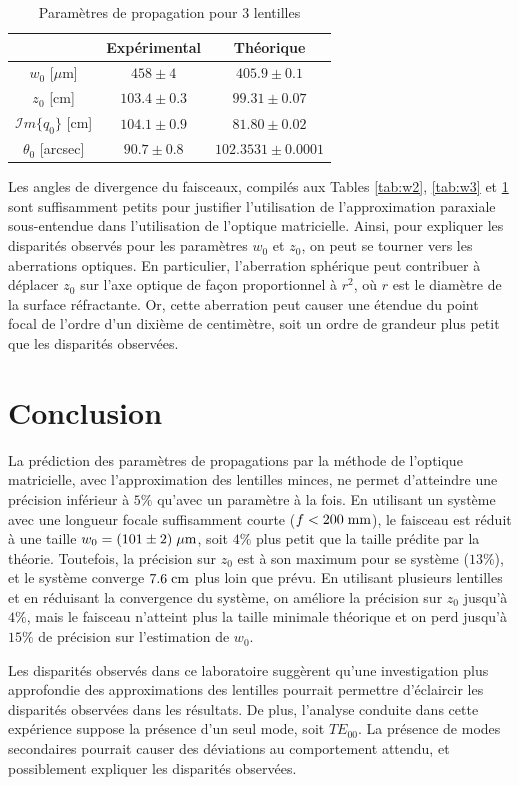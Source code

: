 \documentclass[10pt,letterpaper,twocolumn]{article}
\newcommand{\s}{\hspace{0.1cm}}
\begin{document}
\begin{table}[H]
	\centering
	\caption{Paramètres de propagation pour 3 lentilles}
	\label{tab:w4}
	\begin{tabular}{|c|c|c|}
		\hline
			&Expérimental & Théorique \\\hline
		$w_0$ [$\mu$m] & $458 \pm 4$& $405.9 \pm 0.1$ \\\hline
		  $z_0$ [cm] & $103.4 \pm 0.3$  & $99.31 \pm 0.07$ \\\hline
		  $\mathcal{I}m\{q_0\}$ [cm]  & $104.1 \pm 0.9$  & $81.80 \pm 0.02$ \\\hline
		  $\theta_0$ [arcsec]& $90.7 \pm 0.8$ & $102.3531 \pm  0.0001$ \\\hline
	\end{tabular}
\end{table}

Les angles de divergence du faisceaux, compilés aux Tables \ref{tab:w2}, \ref{tab:w3} et \ref{tab:w4} sont suffisamment petits pour justifier l'utilisation de l'approximation paraxiale sous-entendue dans l'utilisation de l'optique matricielle. Ainsi, pour expliquer les disparités observés pour les paramètres $w_0$ et $z_0$, on peut se tourner vers les aberrations optiques. En particulier, l'aberration sphérique peut contribuer à déplacer $z_0$ sur l'axe optique de façon proportionnel à $r^2$\supercite{Pedrotti}, où $r$ est le diamètre de la surface réfractante. Or, cette aberration peut causer une étendue du point focal de l'ordre d'un dixième de centimètre, soit un ordre de grandeur plus petit que les disparités observées. 

\section{Conclusion}\label{sec:conclusion} %
La prédiction des paramètres de propagations par la méthode de l'optique matricielle, avec l'approximation des lentilles minces, ne permet d'atteindre une précision inférieur à $5\%$ qu'avec un paramètre à la fois. En utilisant un système avec une longueur focale suffisamment courte ($f < 200\s \text{mm}$), le faisceau est réduit à une taille $w_0 = (101 \pm 2) \s \mu\text{m}$, soit $4\%$ plus petit que la taille prédite par la théorie. Toutefois, la précision sur $z_0$ est à son maximum pour se système ($13\%$), et le système converge $7.6\s \text{cm}$ plus loin que prévu. En utilisant plusieurs lentilles et en réduisant la convergence du système, on améliore la précision sur $z_0$ jusqu'à $4\%$, mais le faisceau n'atteint plus la taille minimale théorique et on perd jusqu'à $15\%$ de précision sur l'estimation de $w_0$.\par
Les disparités observés dans ce laboratoire suggèrent qu'une investigation plus approfondie des approximations des lentilles pourrait permettre d'éclaircir les disparités observées dans les résultats. De plus, l'analyse conduite dans cette expérience suppose la présence d'un seul mode, soit $TE_{00}$. La présence de modes secondaires pourrait causer des déviations au comportement attendu, et possiblement expliquer les disparités observées. 



\printbibliography
\end{document}
